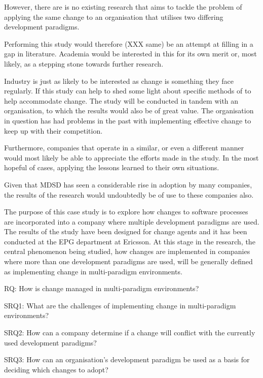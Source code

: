 \documentclass[10pt,twocolumn]{article}
\begin{document}
However, there are is no existing research that aims to tackle the problem of applying the same change to an organisation that utilises two differing development paradigms.

Performing this study would therefore (XXX same) be an attempt at filling in a gap in literature. Academia would be interested in this for its own merit or, most likely, as a stepping stone towards further research.

Industry is just as likely to be interested as change is something they face regularly. If this study can help to shed some light about specific methods of to help accommodate change. The study will be conducted in tandem with an organisation, to which the results would also be of great value. The organisation in question has had problems in the past with implementing effective change to keep up with their competition. 

Furthermore, companies that operate in a similar, or even a different manner would most likely be able to appreciate the efforts made in the study. In the most hopeful of cases, applying the lessons learned to their own situations.

Given that MDSD has seen a considerable rise in adoption by many companies\cite{millermda}, the results of the research would undoubtedly be of use to these companies also.

The purpose of this case study is to explore how changes to software processes are incorporated into a company where multiple development paradigms are used. The results of the study have been designed for change agents and it has been conducted at the EPG department at Ericsson. At this stage in the research, the central phenomenon being studied, how changes are implemented in companies where more than one development paradigms are used, will be generally defined as implementing change in multi-paradigm environments. 


RQ: How is change managed in multi-paradigm environments?

SRQ1: What are the challenges of implementing change in multi-paradigm environments?

SRQ2: How can a company determine if a change will conflict with the currently used development paradigms?

SRQ3: How can an organisation's development paradigm be used as a basis for deciding which changes to adopt?
\end{document}

